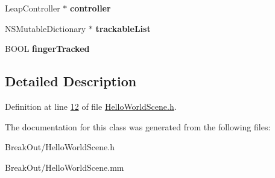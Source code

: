 \begin{DoxyCompactItemize}
\item 
\hypertarget{interface_hello_world_af12f83384b70d9d5cbea1d3e72be5443}{Leap\-Controller $\ast$ {\bfseries controller}}\label{dd/d0c/interface_hello_world_af12f83384b70d9d5cbea1d3e72be5443}

\item 
\hypertarget{interface_hello_world_a797f5dc66315291bb60d2d2876a9d10b}{N\-S\-Mutable\-Dictionary $\ast$ {\bfseries trackable\-List}}\label{dd/d0c/interface_hello_world_a797f5dc66315291bb60d2d2876a9d10b}

\item 
\hypertarget{interface_hello_world_a2c25ec48f85d3df5ea629537feab7262}{B\-O\-O\-L {\bfseries finger\-Tracked}}\label{dd/d0c/interface_hello_world_a2c25ec48f85d3df5ea629537feab7262}

\end{DoxyCompactItemize}


\subsection{Detailed Description}


Definition at line \hyperlink{_hello_world_scene_8h_source_l00012}{12} of file \hyperlink{_hello_world_scene_8h_source}{Hello\-World\-Scene.\-h}.



The documentation for this class was generated from the following files\-:\begin{DoxyCompactItemize}
\item 
Break\-Out/Hello\-World\-Scene.\-h\item 
Break\-Out/Hello\-World\-Scene.\-mm\end{DoxyCompactItemize}

